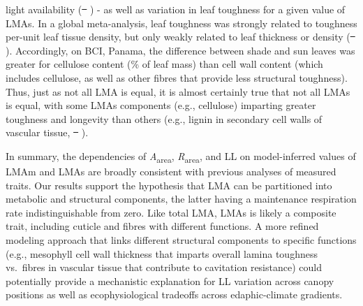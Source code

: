\documentclass[
  12pt,
  letterpaper,
  DIV=11,
  numbers=noendperiod]{scrartcl}
\providecommand{\DIFadd}[1]{{\protect\color{blue}\uwave{#1}}} %
\providecommand{\DIFdel}[1]{{\protect\color{red}\sout{#1}}}                      %
\providecommand{\DIFaddbegin}{} %
\providecommand{\DIFaddend}{} %
\providecommand{\DIFdelbegin}{} %
\providecommand{\DIFdelend}{} %
\newcommand{\DIFscaledelfig}{0.5}
\newlength{\DIFdelgraphicswidth} %
\newlength{\DIFdelgraphicsheight} %
\newcommand{\DIFaddincludegraphics}[2][]{{\color{blue}\fbox{\DIFOincludegraphics[#1]{#2}}}} %
\newcommand{\DIFdelincludegraphics}[2][]{%
\sbox{\DIFdelgraphicsbox}{\DIFOincludegraphics[#1]{#2}}%
\settoboxwidth{\DIFdelgraphicswidth}{\DIFdelgraphicsbox} %
\settoboxtotalheight{\DIFdelgraphicsheight}{\DIFdelgraphicsbox} %
\scalebox{\DIFscaledelfig}{%
\parbox[b]{\DIFdelgraphicswidth}{\usebox{\DIFdelgraphicsbox}\\[-\baselineskip] \rule{\DIFdelgraphicswidth}{0em}}\llap{\resizebox{\DIFdelgraphicswidth}{\DIFdelgraphicsheight}{%
\setlength{\unitlength}{\DIFdelgraphicswidth}%
\begin{picture}(1,1)%
\thicklines\linethickness{2pt} %
{\color[rgb]{1,0,0}\put(0,0){\framebox(1,1){}}}%
{\color[rgb]{1,0,0}\put(0,0){\line( 1,1){1}}}%
{\color[rgb]{1,0,0}\put(0,1){\line(1,-1){1}}}%
\end{picture}%
}\hspace*{3pt}}} %
} %
\DeclareRobustCommand{\DIFaddbegin}{\DIFOaddbegin \let\includegraphics\DIFaddincludegraphics} %
\DeclareRobustCommand{\DIFaddend}{\DIFOaddend \let\includegraphics\DIFOincludegraphics} %
\DeclareRobustCommand{\DIFdelbegin}{\DIFOdelbegin \let\includegraphics\DIFdelincludegraphics} %
\DeclareRobustCommand{\DIFdelend}{\DIFOaddend \let\includegraphics\DIFOincludegraphics} %
\begin{document}
light availability (\DIFdelbegin \DIFdel{\mbox{%
\citeproc{ref-Kikuzawa1991}{Kikuzawa 1991}}\hspace{0pt}%
}\DIFdelend \DIFaddbegin \DIFadd{\mbox{%
\citeproc{ref-Kikuzawa1991}{Kikuzawa, 1991}}\hspace{0pt}%
}\DIFaddend ) - as
well as variation in leaf toughness for a given value of LMAs. In a
global meta-analysis, leaf toughness was strongly related to toughness
per-unit leaf tissue density, but only weakly related to leaf thickness
or density (\DIFdelbegin \DIFdel{\mbox{%
\citeproc{ref-Onoda2011}{Onoda et al. 2011}}\hspace{0pt}%
}\DIFdelend \DIFaddbegin \DIFadd{\mbox{%
\citeproc{ref-Onoda2011}{Onoda et al., 2011}}\hspace{0pt}%
}\DIFaddend ). Accordingly,
on BCI, Panama, the difference between shade and sun leaves was greater
for cellulose content (\% of leaf mass) than cell wall content (which
includes cellulose, as well as other fibres that provide less structural
toughness). Thus, just as not all LMA is equal, it is almost certainly
true that not all LMAs is equal, with some LMAs components (e.g.,
cellulose) imparting greater toughness and longevity than others (e.g.,
lignin in secondary cell walls of vascular tissue,
\DIFdelbegin \DIFdel{\mbox{%
\citeproc{ref-Kitajima2016}{Kitajima et al. 2016}}\hspace{0pt}%
}\DIFdelend \DIFaddbegin \DIFadd{\mbox{%
\citeproc{ref-Kitajima2016}{Kitajima et al., 2016}}\hspace{0pt}%
}\DIFaddend ).

In summary, the dependencies of \emph{A}\textsubscript{area},
\emph{R}\textsubscript{area}, and LL on model-inferred values of LMAm
and LMAs are broadly consistent with previous analyses of measured
traits. Our results support the hypothesis that LMA can be partitioned
into metabolic and structural components, the latter having a
maintenance respiration rate indistinguishable from zero. Like total
LMA, LMAs is likely a composite trait, including cuticle and fibres with
different functions. A more refined modeling approach that links
different structural components to specific functions (e.g., mesophyll
cell wall thickness that imparts overall lamina toughness vs.~fibres in
vascular tissue that contribute to cavitation resistance) could
potentially provide a mechanistic explanation for LL variation across
canopy positions as well as ecophysiological tradeoffs across
edaphic-climate gradients.
\end{document}
